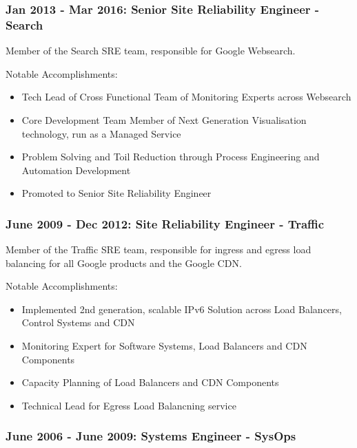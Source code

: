 \documentclass[a4paper, 10pt] {article}
\begin{document}
\subsubsection*{Jan 2013 - Mar 2016: Senior Site Reliability Engineer - Search}

Member of the Search SRE team, responsible for Google Websearch.

\vspace{5mm} %

Notable Accomplishments:

\begin{itemize}
  \item Tech Lead of Cross Functional Team of Monitoring Experts across Websearch
  \item Core Development Team Member of Next Generation Visualisation technology, run as a Managed Service
  \item Problem Solving and Toil Reduction through Process Engineering and Automation Development
  \item Promoted to Senior Site Reliability Engineer
\end{itemize}

\subsubsection*{June 2009 - Dec 2012: Site Reliability Engineer - Traffic}

Member of the Traffic SRE team, responsible for ingress and egress load balancing for all Google products and the Google CDN. 

\vspace{5mm} %

Notable Accomplishments:

\begin{itemize}
  \item Implemented 2nd generation, scalable IPv6 Solution across Load Balancers, Control Systems and CDN
  \item Monitoring Expert for Software Systems, Load Balancers and CDN Components 
  \item Capacity Planning of Load Balancers and CDN Components
  \item Technical Lead for Egress Load Balancning service
\end{itemize}

\subsubsection*{June 2006 - June 2009: Systems Engineer - SysOps}
\end{document}
